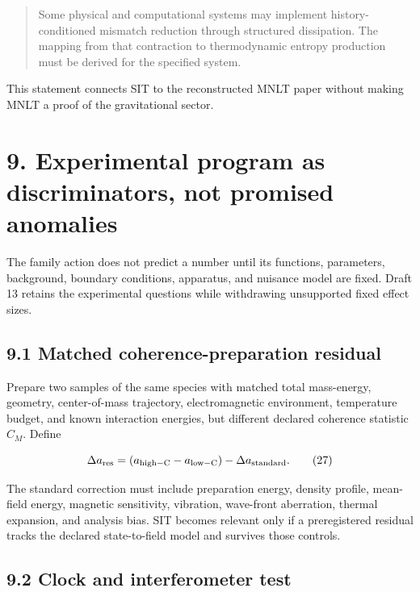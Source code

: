 \documentclass[
  american,
  11pt,
  letterpaper,
]{article}
\begin{document}
\begin{quote}
Some physical and computational systems may implement history-conditioned mismatch reduction through structured dissipation. The mapping from that contraction to thermodynamic entropy production must be derived for the specified system.
\end{quote}

This statement connects SIT to the reconstructed MNLT paper without making MNLT a proof of the gravitational sector.

\section{9. Experimental program as discriminators, not promised anomalies}\label{experimental-program-as-discriminators-not-promised-anomalies}

The family action does not predict a number until its functions, parameters, background, boundary conditions, apparatus, and nuisance model are fixed. Draft 13 retains the experimental questions while withdrawing unsupported fixed effect sizes.

\subsection{9.1 Matched coherence-preparation residual}\label{matched-coherence-preparation-residual}

Prepare two samples of the same species with matched total mass-energy, geometry, center-of-mass trajectory, electromagnetic environment, temperature budget, and known interaction energies, but different declared coherence statistic \(C_M\). Define

\begin{equation}
\Delta a_{\rm res}
=\left(a_{\rm high-C}-a_{\rm low-C}\right)
-\Delta a_{\rm standard}.
\tag{27}
\end{equation}

The standard correction must include preparation energy, density profile, mean-field energy, magnetic sensitivity, vibration, wave-front aberration, thermal expansion, and analysis bias. SIT becomes relevant only if a preregistered residual tracks the declared state-to-field model and survives those controls.

\subsection{9.2 Clock and interferometer test}\label{clock-and-interferometer-test}
\end{document}
